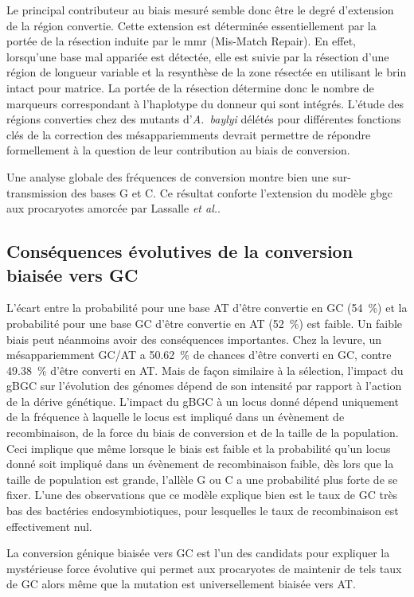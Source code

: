 Le principal contributeur au biais mesuré semble donc être le degré d'extension
de la région convertie. Cette extension est déterminée essentiellement par la
portée de la résection induite par le \ac{mmr} (Mis-Match Repair). En effet,
lorsqu'une base mal appariée est détectée, elle est suivie par la résection
d'une région de longueur variable et la resynthèse de la zone résectée en
utilisant le brin intact pour matrice\cite{spies_mismatch_2015}. La portée de la
résection détermine donc le nombre de marqueurs correspondant à l'haplotype du
donneur qui sont intégrés. L'étude des régions converties chez des mutants
d'\emph{A.~baylyi} délétés pour différentes fonctions clés de la correction des
mésappariemments devrait permettre de répondre formellement à la question de
leur contribution au biais de conversion.

Une analyse globale des fréquences de conversion montre bien une
sur-transmission des bases G et C. Ce résultat conforte l'extension du modèle
\ac{gbgc} aux procaryotes amorcée par Lassalle \textit{et
  al.}\cite{lassalle_gc-content_2015}.

\subsection{Conséquences évolutives de la conversion biaisée vers GC}
\label{subsec:discu-conséquences}

L'écart entre la probabilité pour une base AT d'être convertie en GC
(\SI{54}{\percent}) et la probabilité pour une base GC d'être convertie en AT
(\SI{52}{\percent}) est faible. Un faible biais peut néanmoins avoir des
conséquences importantes. Chez la levure, un mésappariemment GC/AT a
\SI{50.62}{\percent} de chances d'être converti en GC, contre
\SI{49.38}{\percent} d'être converti en
AT\cite{mancera_high-resolution_2008,duret_biased_2009}. Mais de façon similaire
à la sélection, l'impact du gBGC sur l'évolution des génomes dépend de son
intensité par rapport à l'action de la dérive génétique. L'impact du gBGC à un
locus donné dépend uniquement de la fréquence à laquelle le locus est impliqué
dans un évènement de recombinaison, de la force du biais de conversion et de la
taille de la
population\cite{nagylaki_evolution_1983,lassalle_gc-content_2015,duret_biased_2009,duret_impact_2008}.
Ceci implique que même lorsque le biais est faible et la probabilité qu'un locus
donné soit impliqué dans un évènement de recombinaison faible, dès lors que la
taille de population est grande, l'allèle G ou C a une probabilité plus forte de
se fixer. L'une des observations que ce modèle explique bien est le taux de GC
très bas des bactéries endosymbiotiques, pour lesquelles le taux de
recombinaison est effectivement nul\cite{moran_genomics_2008}.

La conversion génique biaisée vers GC est l'un des candidats pour expliquer la
mystérieuse force évolutive qui permet aux procaryotes de maintenir de tels taux
de GC alors même que la mutation est universellement biaisée vers
AT\cite{hildebrand_evidence_2010,hershberg_evidence_2010}.

\afterpage{\blankpage}

